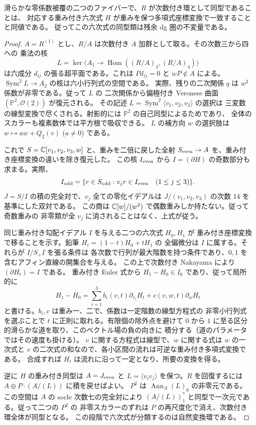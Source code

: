 \begin{corollary}[無標識環からの重み付き六次式の復元]\label{nft:cor:sign-sextic}
滑らかな零係数被覆の二つのファイバーで、$R$ が次数付き環として同型であることは、
対応する重み付き六次式 $H$ が重みを保つ多項式座標変換で一致することと同値である。
従ってこの六次式の同型類は残余 dg 圏の不変量である。
\end{corollary}
\begin{proof}
$A=R^{(1)}$ とし、$R/A$ は次数付き $A$ 加群として取る。その次数三から四への
乗法の核
\[
 L=\ker\big(A_1\longrightarrow
          \operatorname{Hom}((R/A)_3,(R/A)_4)\big)
\]
は六成分 $d_{ij}$ の張る超平面である。これは $Pd_{ij}=0$ と
$wP\notin A$ による。$\operatorname{Sym}^2 L\to A_2$ の核は六小行列式の空間である。
実際、残りの二次関係 $q$ は $w^2$ 係数が非零である。従って $L$ の
二次関係から偏極付き Veronese 曲面 $(\mathbb P^2,\mathcal O(2))$ が復元される。
その記述 $L=\operatorname{Sym}^2\langle v_1,v_2,v_3\rangle$ の選択は
三変数の線型変換で尽くされる。射影的には $\mathbb P^2$ の自己同型によるためであり、
全体のスカラーも複素数体では平方根で吸収できる。
$L$ の補方向 $w$ の選択肢は $w\mapsto a w+Q_2(v)$ ($a\ne0$) である。

これで $S=\mathbb C[v_1,v_2,v_3,w]$ と、重みを二倍に戻した全射
$S_{\rm even}\to A$ を、重み付き座標変換の違いを除き復元した。
この核 $I_{\rm even}$ から $I=(\partial H)$ の奇数部分も求まる。実際、
\[
 I_{\rm odd}=\{r\in S_{\rm odd}:v_jr\in I_{\rm even}\quad(1\le j\le3)\}.
\]
$J=S/I$ の積の完全対で、$v_j$ 全ての零化イデアルは
$J/(v_1,v_2,v_3)$ の次数 $14$ を基準にした双対である。
この商は $\mathbb C[w]/(w^2)$ で偶数重みしか持たない。従って奇数重みの
非零類が全 $v_j$ に消されることはなく、上式が従う。

同じ重み付き勾配イデアル $I$ を与える二つの六次式 $H_0,H_1$ が
重み付き座標変換で移ることを示す。鉛筆 $H_t=(1-t)H_0+tH_1$ の
全偏微分は $I$ に属する。それらが $I/S_+ I$ を張る条件は
各次数で行列が最大階数を持つ条件であり、$0,1$ を含むアフィン直線の開集合を与える。
この上で次数付き Nakayama により $(\partial H_t)=I$ である。
重み付き Euler 式から $H_1-H_0\in I_6$ であり、従って局所的に
\[
 H_1-H_0=\sum_{i=1}^3 b_i(v,t)\partial_{v_i}H_t
                   +c(v,w,t)\partial_w H_t
\]
と書ける。$b_i,c$ は重み一、二で、係数は一定階数の線型方程式の
非零小行列式を選ぶことで $t$ に正則に取れる。有限個の除外点を避けて
$0$ から $1$ に至る区分的滑らかな道を取り、このベクトル場の負の向きに
積分する（道のパラメータではその速度も掛ける）。
$v$ に関する方程式は線型で、$w$ に関する式は $w$ の一次式と
$v$ の二次式の和なので、各小区間の流れは可逆な重み付き多項式変換である。
合成すれば $H_t$ は流れに沿って一定となり、所要の変換を得る。

逆に $H$ の重み付き同型は $A=J_{\rm even}$ と
$L=\langle v_i v_j\rangle$ を保つ。$R$ を回復するには
$A\oplus P\cdot(A/(L))$ に積を戻せばよい。
$P^2$ は $\operatorname{Ann}_A(L)_6$ の非零元である。
この空間は $A$ の socle 次数七の完全対により
$(A/(L))_1^*$ と同型で一次元である。従って二つの $P^2$ の
非零スカラーのずれは $P$ の再尺度化で消え、次数付き環全体が同型となる。
この段階で六次式が分類するのは自然変換環である。
\end{proof}

